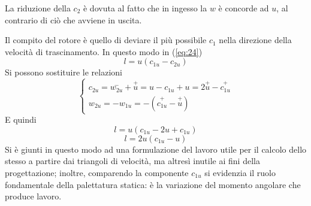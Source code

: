 \documentclass[a4paper, 15pt]{article}
\begin{document}
\begin{adjustwidth}{2in}{}
	La riduzione della $c_2$ è dovuta al fatto che in ingesso la $w$ è concorde ad $u$, al contrario di ciò che avviene in uscita. 
	
	Il compito del rotore è quello di deviare il più possibile $c_1$ nella direzione della velocità di trascinamento. 
\newpage	
	In questo modo in (\ref{eq:24})
	\[l = u(c_{1u}-c_{2u})\]
	Si possono sostituire le relazioni
	\[\begin{cases}
		c_{2u} = \overset{-}{w_{2u}}+\overset{+}{u} = u-c_{1u}+u = 2\overset{+}{u}-\overset{+}{c_{1u}} \\
	w_{2u} = -w_{1u} = -(\overset{+}{c_{1u}}-\overset{+}{u})
	\end{cases}\]
	E quindi
	\[l = u(c_{1u}-2u+c_{1u})\]
	\begin{equation}\label{eq:14}
		\boxed{l=2u(c_{1u}-u)}
	\end{equation}
	Si è giunti in questo modo ad una formulazione del lavoro utile per il calcolo dello stesso a partire dai triangoli di velocità, ma altresì inutile ai fini della progettazione; inoltre, comparendo la componente $c_{1u}$ si evidenzia il ruolo fondamentale della palettatura statica: è la variazione del momento angolare che produce lavoro. 	
\end{adjustwidth}
\end{document}
